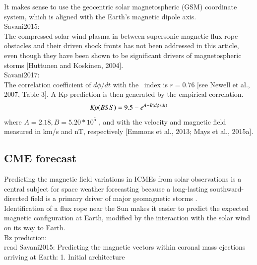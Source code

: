 It makes sense to use the geocentric solar magnetospheric (GSM) coordinate system, which is aligned with the Earth's magnetic dipole axis.\\

Savani2015:\\
The compressed solar wind plasma in between supersonic magnetic flux rope obstacles and their driven shock fronts has not been addressed in this article, even though they have been shown to be significant drivers of magnetospheric storms [Huttunen and Koskinen, 2004].\\

Savani2017:\\
The correlation coefficient of $d\phi/dt$ with the \Kp~index is $r = 0.76$ [see Newell et al., 2007, Table 3]. A Kp prediction is then generated by the empirical correlation.\\
\begin{align}
	\textit{Kp}(BSS) = 9.5 - e^{A-B(d\phi/dt)}
\end{align}
where $A = 2.18, B = 5.20 * 10^5$ , and with the velocity and magnetic field measured in km/s and nT, respectively [Emmons et al., 2013; Mays et al., 2015a].\\


\subsection{CME forecast}

Predicting the magnetic field variations in ICMEs from solar observations is a central subject for space weather forecasting because a long-lasting southward-directed  field is a primary driver of major geomagnetic storms \citep{Zhang2007}.\\

Identification of a flux rope near the Sun makes it easier to predict the expected magnetic configuration at Earth, modified by the interaction with the solar wind on its way to Earth.\\

Bz prediction:\\
read Savani2015: Predicting the magnetic vectors within coronal mass ejections arriving at Earth: 1. Initial architecture\\

